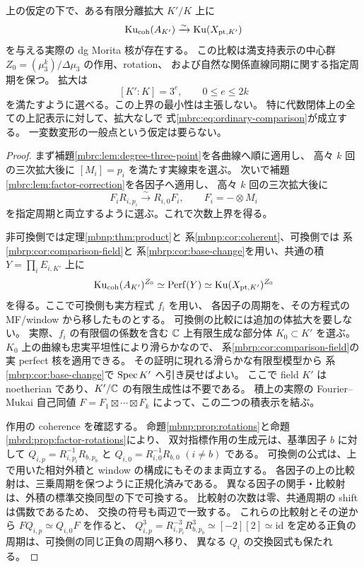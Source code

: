 \begin{theorem}[固定体値点の有限比較と次数上界]
\label{mbrc:thm:finite-point-comparison}
上の仮定の下で、ある有限分離拡大 $K'/K$ 上に
\begin{equation}\label{mbrc:eq:ordinary-comparison}
 \operatorname{Ku}_{\mathrm{coh}}(A_{K'})
       \xrightarrow{\sim}\operatorname{Ku}(X_{\mathrm{pt},K'})
\end{equation}
を与える実際の dg Morita 核が存在する。
この比較は満支持表示の中心群
$Z_0=(\mu_3^k)/\Delta\mu_3$ の作用、rotation、
および自然な関係直線同期に関する指定周期を保つ。
拡大は
\[
 [K':K]=3^e,\qquad 0\le e\le2k
\]
を満たすように選べる。この上界の最小性は主張しない。
特に代数閉体上の全ての上記表示に対して、拡大なしで
式\eqref{mbrc:eq:ordinary-comparison}が成立する。
一変数変形の一般点という仮定は要らない。
\end{theorem}
\begin{proof}
まず補題\ref{mbrc:lem:degree-three-point}を各曲線へ順に適用し、
高々 $k$ 回の三次拡大後に $[M_i]=p_i$ を満たす実線束を選ぶ。
次いで補題\ref{mbrc:lem:factor-correction}を各因子へ適用し、
高々 $k$ 回の三次拡大後に
\[
 F_iR_{i,p_i}\xrightarrow{\sim}R_{i,0}F_i,\qquad
 F_i=-\otimes M_i
\]
を指定周期と両立するように選ぶ。これで次数上界を得る。

非可換側では定理\ref{mbnp:thm:product}と
系\ref{mbnp:cor:coherent}、可換側では
系\ref{mbrp:cor:comparison-field}と
系\ref{mbrp:cor:base-change}を用い、共通の積
$Y=\prod_iE_{i,K'}$ 上に
\[
 \operatorname{Ku}_{\mathrm{coh}}(A_{K'})^{Z_0}
       \simeq\operatorname{Perf}(Y)
       \simeq\operatorname{Ku}(X_{\mathrm{pt},K'})^{Z_0}
\]
を得る。ここで可換側も実方程式 $f_i$ を用い、
各因子の周期を、その方程式の MF/window から移したものとする。
可換側の比較には追加の体拡大を要しない。
実際、$f_i$ の有限個の係数を含む $\mathbb C$ 上有限生成な部分体 $K_0\subset K'$ を選ぶ。
$K_0$ 上の曲線も忠実平坦性により滑らかなので、
系\ref{mbrp:cor:comparison-field}の実 perfect 核を適用できる。
その証明に現れる滑らかな有限型模型から
系\ref{mbrp:cor:base-change}で $\operatorname{Spec} K'$ へ引き戻せばよい。
ここで field $K'$ は noetherian であり、$K'/\mathbb C$ の有限生成性は不要である。
積上の実際の Fourier--Mukai 自己同値
$F=F_1\boxtimes\cdots\boxtimes F_k$ によって、この二つの積表示を結ぶ。

作用の coherence を確認する。
命題\ref{mbnp:prop:rotations}と命題\ref{mbrd:prop:factor-rotations}により、
双対指標作用の生成元は、基準因子 $b$ に対して
$Q_{i,p}=R_{i,p_i}^{-1}R_{b,p_b}$ と
$Q_{i,0}=R_{i,0}^{-1}R_{b,0}$ $(i\ne b)$ である。
可換側の公式は、上で用いた相対外積と window の構成にもそのまま両立する。
各因子の上の比較射は、三乗周期を保つように正規化済みである。
異なる因子の関手・比較射は、外積の標準交換同型の下で可換する。
比較射の次数は零、共通周期の shift は偶数であるため、
交換の符号も両辺で一致する。
これらの比較射とその逆から
$FQ_{i,p}\simeq Q_{i,0}F$ を作ると、
$Q_{i,p}^3=R_{i,p_i}^{-3}R_{b,p_b}^3\simeq[-2][2]\simeq\mathrm{id}$
を定める正負の周期は、可換側の同じ正負の周期へ移り、
異なる $Q_i$ の交換図式も保たれる。


\end{proof}
